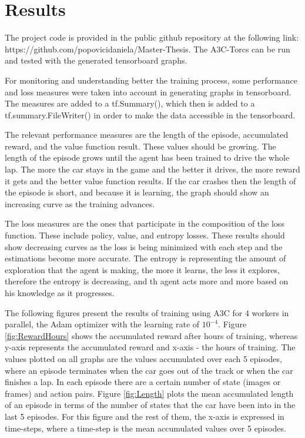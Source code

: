 \chapter{Results}
\label{cha:Result}
The project code is provided in the public github repository at the following link: https://github.com/popovicidaniela/Master-Thesis.
The A3C-Torcs can be run and tested with the generated tensorboard graphs.

For monitoring and understanding better the training process, some performance and loss measures were taken into account in generating graphs in tensorboard. The measures are added to a tf.Summary(), which then is added to a tf.summary.FileWriter() in order to make the data accessible in the tensorboard.

The relevant performance measures are the length of the episode, accumulated reward, and the value function result. These values should be growing. The length of the episode grows until the agent has been trained to drive the whole lap. The more the car stays in the game and the better it drives, the more reward it gets and the better value function results. If the car crashes then the length of the episode is short, and because it is learning, the graph should show an increasing curve as the training advances. 

The loss measures are the ones that participate in the composition of the loss function. These include policy, value, and entropy losses. These results should show decreasing curves as the loss is being minimized with each step and the estimations become more accurate. The entropy is representing the amount of exploration that the agent is making, the more it learns, the less it explores, therefore the entropy is decreasing, and th agent acts more and more based on his knowledge as it progresses.

The following figures present the results of training using A3C for 4 workers in parallel, the Adam optimizer with the learning rate of $10^{-4}$. Figure \ref{fig:RewardHours} shows the accumulated reward after hours of training, whereas y-axis represents the accumulated reward and x-axis - the hours of training. The values plotted on all graphs are the values accumulated over each 5 episodes, where an episode terminates when the car goes out of the track or when the car finishes a lap. In each episode there are a certain number of state (images or frames) and action pairs. Figure \ref{fig:Length} plots the mean accumulated length of an episode in terms of the number of states that the car have been into in the last 5 episodes. For this figure and the rest of them, the x-axis is expressed in time-steps, where a time-step is the mean accumulated values over 5 episodes.

